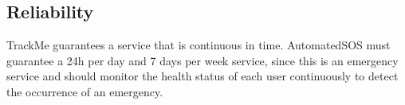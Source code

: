 \subsection{Reliability}
TrackMe guarantees a service that is continuous in time.
AutomatedSOS must guarantee a 24h per day and 7 days per week service, since this is an emergency service and should monitor the health status of each user continuously to detect the occurrence of an emergency.

